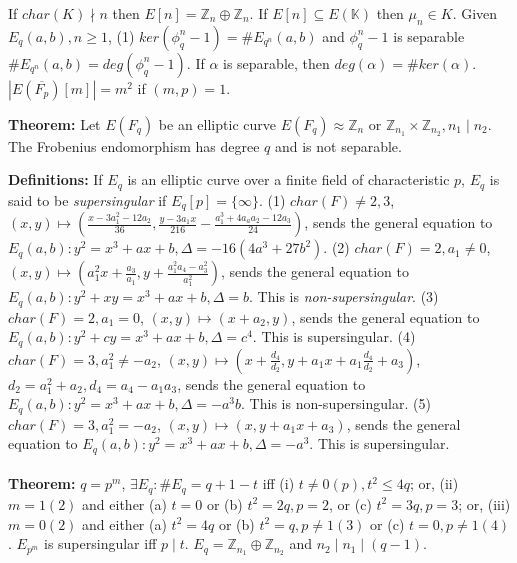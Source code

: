 If $char(K) \nmid n$ then $E[n]= {\mathbb Z}_n \oplus {\mathbb Z}_n$. 
If $E[n] \subseteq E({\mathbb K})$ then $\mu_n \in K$.  Given $E_q(a,b), n \ge 1$, (1)
$ker(\phi_q^n -1)= \#E_{q^n}(a,b)$ and 
$\phi_q^n -1$ is separable
$\#E_{q^n}(a,b)= deg(\phi_q^n -1)$.
If $\alpha$ is separable, then $deg(\alpha)= \#ker(\alpha)$.  
$|E({\overline {F_p}})[m]|= m^2$ if $(m,p)=1$.
\begin{quote}
\end{quote}
{\bf Theorem:}
Let $E(F_q)$ be an elliptic curve $E(F_q) \approx {\mathbb Z}_n$ or
${\mathbb Z}_{n_1} \times {\mathbb Z}_{n_2}, n_1 \mid n_2 $.  
The Frobenius endomorphism has degree $q$ and is not separable.
\begin{quote}
\end{quote}
{\bf Definitions:}
If $E_q$ is an elliptic curve over
a finite field of characteristic $p$, $E_q$ is said to be \emph{supersingular} if
$E_q[p]= \{ \infty \}$.
(1) $char(F) \ne 2,3$, $(x,y) \mapsto ({\frac {x-3a_1^2-12 a_2} {36}}, 
{\frac {y - 3 a_1 x} {216}} - {\frac {a_1^3 + 4 a_a a_2 -12 a_3} {24}})$, 
sends the general equation to 
$E_q(a,b): y^2= x^3 + ax +b, \Delta = -16(4 a^3 + 27 b^2)$.
(2) $char(F) = 2, a_1 \ne 0$, $(x,y) \mapsto 
(a_1^2x+{\frac {a_3} {a_1}}, y+{\frac {a_1^2 a_4 - a_3^2} {a_1^2}})$,
sends the general equation to 
$E_q(a,b): y^2 + xy = x^3 + ax +b, \Delta = b$.  This is \emph{non-supersingular}.
(3) $char(F) = 2, a_1 = 0$, $(x,y) \mapsto 
(x+a_2, y)$, sends the general equation to 
$E_q(a,b): y^2 + cy = x^3 + ax +b, \Delta = c^4$.  This is supersingular.
(4) $char(F) = 3, a_1^2 \ne - a_2$, $(x,y) \mapsto 
(x+{\frac {d_4} {d_2}}, y+ a_1 x + a_1 {\frac {d_4} {d_2}} +a_3)$, 
$d_2= a_1^2+a_2, d_4= a_4-a_1 a_3$,
sends the general equation to 
$E_q(a,b): y^2= x^3 + ax +b, \Delta = - a^3 b$.  This is non-supersingular.
(5) $char(F) = 3, a_1^2 = - a_2$, $(x,y) \mapsto 
(x, y+ a_1 x + a_3)$, sends the general equation to 
$E_q(a,b): y^2= x^3 + ax +b, \Delta = - a^3 $.  This is supersingular.
\\
\\
{\bf Theorem:}  $q=p^m$, $\exists E_q: \#E_q= q+1-t$ iff
(i) $t \ne 0 (p), t^2 \le 4q$; or, (ii) $m= 1(2)$ and either (a) $t=0$ or (b)
$t^2=2q, p=2$, or (c) $t^2=3q, p=3$; or, (iii) $m=0 (2)$ and either (a)
$t^2=4q$ or (b) $t^2=q, p \ne 1 (3)$ or (c) $t=0, p \ne 1 (4)$. $E_{p^m}$ is supersingular
iff $p \mid t$.  $E_q = {\mathbb Z}_{n_1} \oplus {\mathbb Z}_{n_2}$ and 
$ n_2 \mid n_1 \mid (q-1)$.  
\begin{quote}
\end{quote}

